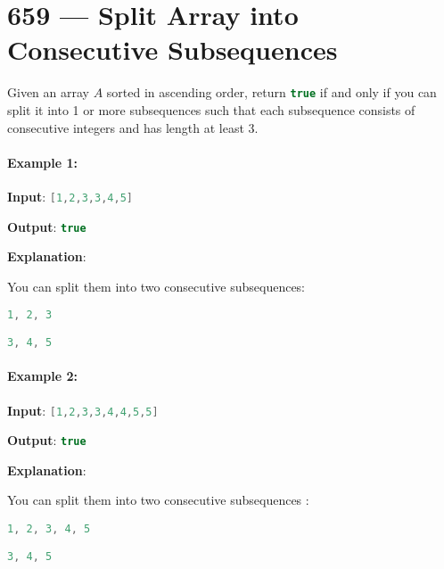 \section{659 --- Split Array into Consecutive Subsequences}
Given an array $A$ sorted in ascending order, return \lstinline[language=C++, basicstyle=\small\ttfamily, keywordstyle=\bfseries\color{green!40!black}]|true| if and only if you can split it into 1 or more subsequences such that each subsequence consists of consecutive integers and has length at least 3.

\paragraph{Example 1:}

\begin{flushleft}
\textbf{Input}: \lstinline[language=C++, basicstyle=\small\ttfamily, keywordstyle=\bfseries\color{green!40!black}]|[1,2,3,3,4,5]|

\textbf{Output}: \lstinline[language=C++, basicstyle=\small\ttfamily, keywordstyle=\bfseries\color{green!40!black}]|true|

\textbf{Explanation}:

You can split them into two consecutive subsequences:
 
\lstinline[language=C++, basicstyle=\small\ttfamily, keywordstyle=\bfseries\color{green!40!black}]|1, 2, 3|

\lstinline[language=C++, basicstyle=\small\ttfamily, keywordstyle=\bfseries\color{green!40!black}]|3, 4, 5|

\end{flushleft}

\paragraph{Example 2:}

\begin{flushleft}
\textbf{Input}: \lstinline[language=C++, basicstyle=\small\ttfamily, keywordstyle=\bfseries\color{green!40!black}]|[1,2,3,3,4,4,5,5]|

\textbf{Output}: \lstinline[language=C++, basicstyle=\small\ttfamily, keywordstyle=\bfseries\color{green!40!black}]|true|

\textbf{Explanation}:

You can split them into two consecutive subsequences : 

\lstinline[language=C++, basicstyle=\small\ttfamily, keywordstyle=\bfseries\color{green!40!black}]|1, 2, 3, 4, 5|

\lstinline[language=C++, basicstyle=\small\ttfamily, keywordstyle=\bfseries\color{green!40!black}]|3, 4, 5|

\end{flushleft}

